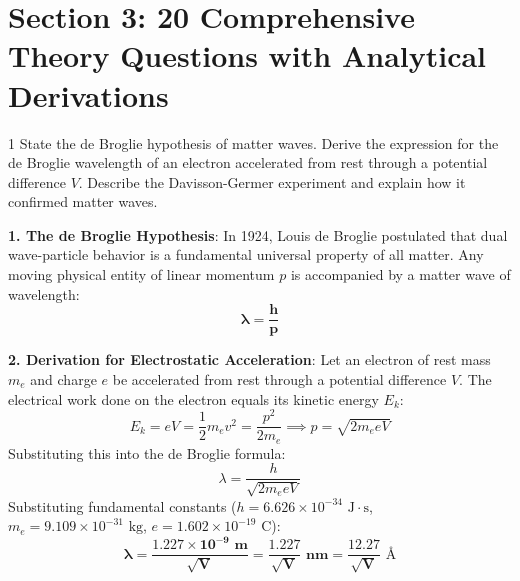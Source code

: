 \newpage
\section{Section 3: 20 Comprehensive Theory Questions with Analytical Derivations}

\begin{theoryq}{1}
State the de Broglie hypothesis of matter waves. Derive the expression for the de Broglie wavelength of an electron accelerated from rest through a potential difference $V$. Describe the Davisson-Germer experiment and explain how it confirmed matter waves.
\end{theoryq}
\begin{theorysol}
\textbf{1. The de Broglie Hypothesis}:
In 1924, Louis de Broglie postulated that dual wave-particle behavior is a fundamental universal property of all matter. Any moving physical entity of linear momentum $p$ is accompanied by a matter wave of wavelength:
\begin{equation}
\mathbf{\lambda = \frac{h}{p}}
\end{equation}

\textbf{2. Derivation for Electrostatic Acceleration}:
Let an electron of rest mass $m_e$ and charge $e$ be accelerated from rest through a potential difference $V$.
The electrical work done on the electron equals its kinetic energy $E_k$:
\begin{equation}
E_k = e V = \frac{1}{2}m_e v^2 = \frac{p^2}{2m_e} \implies p = \sqrt{2 m_e e V}
\end{equation}
Substituting this into the de Broglie formula:
\begin{equation}
\lambda = \frac{h}{\sqrt{2 m_e e V}}
\end{equation}
Substituting fundamental constants ($h = 6.626 \times 10^{-34}\text{ J}\cdot\text{s}$, $m_e = 9.109 \times 10^{-31}\text{ kg}$, $e = 1.602 \times 10^{-19}\text{ C}$):
\begin{equation}
\mathbf{\lambda = \frac{1.227 \times 10^{-9}\text{ m}}{\sqrt{V}} = \frac{1.227}{\sqrt{V}}\text{ nm} = \frac{12.27}{\sqrt{V}}\text{ \AA}}
\end{equation}


\end{theorysol}
